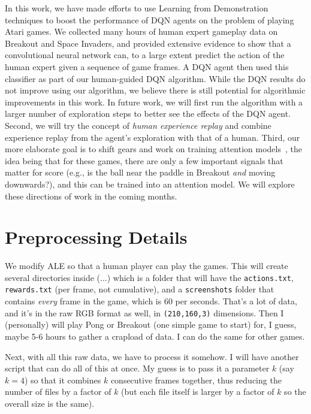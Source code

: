 \documentclass[letterpaper, 10pt, conference]{ieeeconf}
\begin{document}
In this work, we have made efforts to use Learning from Demonstration techniques
to boost the performance of DQN agents on the problem of playing Atari games. We
collected many hours of human expert gameplay data on Breakout and Space
Invaders, and provided extensive evidence to show that a convolutional
neural network can, to a large extent predict the action of the human expert
given a sequence of game frames. A DQN agent then used this classifier as part
of our human-guided DQN algorithm. While the DQN results do not improve using
our algorithm, we believe there is still potential for algorithmic improvements
in this work. In future work, we will first run the algorithm with a larger
number of exploration steps to better see the effects of the DQN agent. Second,
we will try the concept of \emph{human experience replay} and combine experience
replay from the agent's exploration with that of a human. Third, our more
elaborate goal is to shift gears and work on training attention
models~\cite{NIPS2014_5542,icml2015_xuc15}, the idea being that for these games,
there are only a few important signals that matter for score (e.g., is the ball
near the paddle in Breakout \emph{and} moving downwards?), and this can be
trained into an attention model. We will explore these directions of work in the
coming months.






\appendices

\section{Preprocessing Details}\label{app:preprocessing_details}

We modify ALE so that a human player can play the games. This will
    create several directories inside (...)
    which is a folder that will have the \texttt{actions.txt},
    \texttt{rewards.txt} (per frame, not cumulative), and a \texttt{screenshots}
    folder that contains \emph{every} frame in the game, which is 60 per
    seconds. That's a lot of data, and it's in the raw RGB format as well, in
    \texttt{(210,160,3)} dimensions.  Then I (personally) will play Pong or
    Breakout (one simple game to start) for, I guess, maybe 5-6 hours to gather
    a crapload of data. I can do the same for other games.

Next, with all this raw data, we have to process it somehow. I will
    have another script that can do all of this at once. My guess is to pass it
    a parameter $k$ (say $k=4$) so that it combines $k$ consecutive frames
    together, thus reducing the number of files by a factor of $k$ (but each
    file itself is larger by a factor of $k$ so the overall size is the same).
\end{document}
